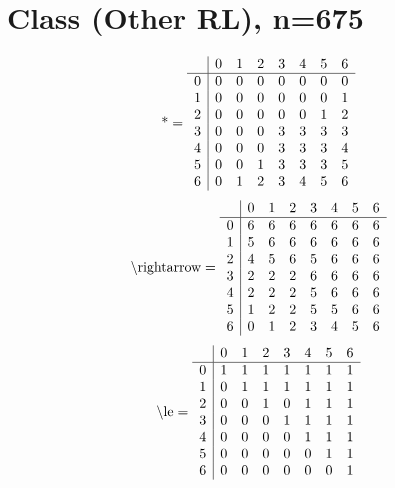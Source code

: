 \documentclass[11pt]{article}
\begin{document}
\section{Class (Other RL), n=675}
\[\text{*} = 
\begin{array}{r | r r r r r r r}
 & 0 & 1 & 2 & 3 & 4 & 5 & 6 \\ \hline
0 & 0 & 0 & 0 & 0 & 0 & 0 & 0 \\
1 & 0 & 0 & 0 & 0 & 0 & 0 & 1 \\
2 & 0 & 0 & 0 & 0 & 0 & 1 & 2 \\
3 & 0 & 0 & 0 & 3 & 3 & 3 & 3 \\
4 & 0 & 0 & 0 & 3 & 3 & 3 & 4 \\
5 & 0 & 0 & 1 & 3 & 3 & 3 & 5 \\
6 & 0 & 1 & 2 & 3 & 4 & 5 & 6 \\
\end{array}
\]
\[\text{\textbackslash rightarrow} = 
\begin{array}{r | r r r r r r r}
 & 0 & 1 & 2 & 3 & 4 & 5 & 6 \\ \hline
0 & 6 & 6 & 6 & 6 & 6 & 6 & 6 \\
1 & 5 & 6 & 6 & 6 & 6 & 6 & 6 \\
2 & 4 & 5 & 6 & 5 & 6 & 6 & 6 \\
3 & 2 & 2 & 2 & 6 & 6 & 6 & 6 \\
4 & 2 & 2 & 2 & 5 & 6 & 6 & 6 \\
5 & 1 & 2 & 2 & 5 & 5 & 6 & 6 \\
6 & 0 & 1 & 2 & 3 & 4 & 5 & 6 \\
\end{array}
\]
\[\text{\textbackslash le} = 
\begin{array}{r | r r r r r r r}
 & 0 & 1 & 2 & 3 & 4 & 5 & 6 \\ \hline
0 & 1 & 1 & 1 & 1 & 1 & 1 & 1 \\
1 & 0 & 1 & 1 & 1 & 1 & 1 & 1 \\
2 & 0 & 0 & 1 & 0 & 1 & 1 & 1 \\
3 & 0 & 0 & 0 & 1 & 1 & 1 & 1 \\
4 & 0 & 0 & 0 & 0 & 1 & 1 & 1 \\
5 & 0 & 0 & 0 & 0 & 0 & 1 & 1 \\
6 & 0 & 0 & 0 & 0 & 0 & 0 & 1 \\
\end{array}
\]
\end{document}
